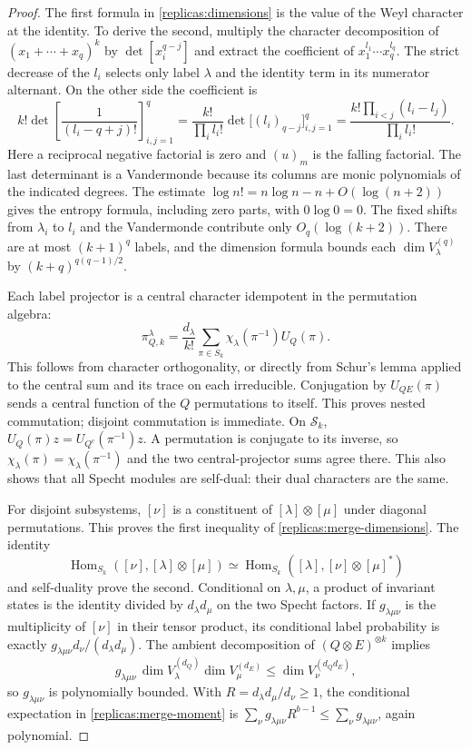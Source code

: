 \begin{proof}
The first formula in \eqref{replicas:dimensions} is the value of the
Weyl character at the identity.  To derive the second, multiply the
character decomposition of $(x_1+\cdots+x_q)^k$ by
$\det[x_i^{q-j}]$ and extract the coefficient of
$x_1^{l_1}\cdots x_q^{l_q}$.  The strict decrease of the $l_i$ selects
only label $\lambda$ and the identity term in its numerator alternant.
On the other side the coefficient is
\[
 k!\det\left[\frac1{(l_i-q+j)!}\right]_{i,j=1}^q
 =\frac{k!}{\prod_i l_i!}
       \det\bigl[(l_i)_{q-j}\bigr]_{i,j=1}^q
 =\frac{k!\prod_{i<j}(l_i-l_j)}{\prod_i l_i!}.
\]
Here a reciprocal negative factorial is zero and $(u)_m$ is the
falling factorial.  The last determinant is a Vandermonde because its
columns are monic polynomials of the indicated degrees.  The estimate
$\log n!=n\log n-n+O(\log(n+2))$ gives the entropy formula, including
zero parts, with $0\log0=0$.  The fixed shifts from $\lambda_i$ to
$l_i$ and the Vandermonde contribute only $O_q(\log(k+2))$.
There are at most $(k+1)^q$ labels, and the dimension formula bounds
each $\dim V^{(q)}_\lambda$ by $(k+q)^{q(q-1)/2}$.

Each label projector is a central character idempotent in the
permutation algebra:
\[
 \pi_{Q,k}^{\lambda}
 =\frac{d_\lambda}{k!}\sum_{\pi\in S_k}
       \chi_\lambda(\pi^{-1})U_Q(\pi).
\]
This follows from character orthogonality, or directly from Schur's
lemma applied to the central sum and its trace on each irreducible.
Conjugation by $U_{QE}(\pi)$ sends a central function of the $Q$
permutations to itself.  This proves nested commutation; disjoint
commutation is immediate.  On $\mathcal S_k$,
$U_Q(\pi)z=U_{Q^c}(\pi^{-1})z$.  A permutation is conjugate to its
inverse, so $\chi_\lambda(\pi)=\chi_\lambda(\pi^{-1})$ and the two
central-projector sums agree there.  This also shows that all Specht
modules are self-dual: their dual characters are the same.

For disjoint subsystems, $[\nu]$ is a constituent of
$[\lambda]\otimes[\mu]$ under diagonal permutations.  This proves
the first inequality of \eqref{replicas:merge-dimensions}.
The identity
\[
 \operatorname{Hom}_{S_k}([\nu],[\lambda]\otimes[\mu])
 \simeq
 \operatorname{Hom}_{S_k}([\lambda],[\nu]\otimes[\mu]^*)
\]
and self-duality prove the second.  Conditional on $\lambda,\mu$, a
product of invariant states is the identity divided by
$d_\lambda d_\mu$ on the two Specht factors.  If
$g_{\lambda\mu\nu}$ is the multiplicity of $[\nu]$ in their tensor
product, its conditional label probability is exactly
$g_{\lambda\mu\nu}d_\nu/(d_\lambda d_\mu)$.
The ambient decomposition of $(Q\otimes E)^{\otimes k}$ implies
\[
 g_{\lambda\mu\nu}\,
 \dim V^{(d_Q)}_\lambda\dim V^{(d_E)}_\mu
 \le \dim V^{(d_Qd_E)}_\nu,
\]
so $g_{\lambda\mu\nu}$ is polynomially bounded.  With
$R=d_\lambda d_\mu/d_\nu\ge1$, the conditional expectation in
\eqref{replicas:merge-moment} is
$\sum_\nu g_{\lambda\mu\nu}R^{b-1}\le\sum_\nu
g_{\lambda\mu\nu}$, again polynomial.


\end{proof}

